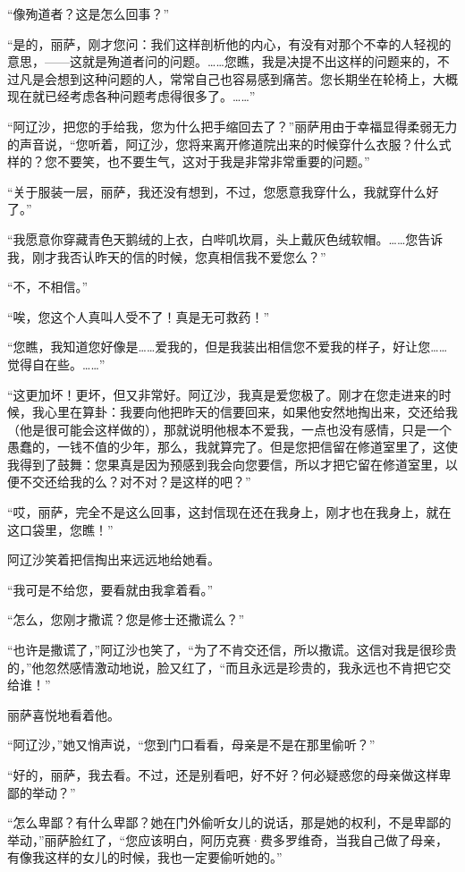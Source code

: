 \par “像殉道者？这是怎么回事？”
\par “是的，丽萨，刚才您问：我们这样剖析他的内心，有没有对那个不幸的人轻视的意思，——这就是殉道者问的问题。……您瞧，我是决提不出这样的问题来的，不过凡是会想到这种问题的人，常常自己也容易感到痛苦。您长期坐在轮椅上，大概现在就已经考虑各种问题考虑得很多了。……”
\par “阿辽沙，把您的手给我，您为什么把手缩回去了？”丽萨用由于幸福显得柔弱无力的声音说，“您听着，阿辽沙，您将来离开修道院出来的时候穿什么衣服？什么式样的？您不要笑，也不要生气，这对于我是非常非常重要的问题。”
\par “关于服装一层，丽萨，我还没有想到，不过，您愿意我穿什么，我就穿什么好了。”
\par “我愿意你穿藏青色天鹅绒的上衣，白哔叽坎肩，头上戴灰色绒软帽。……您告诉我，刚才我否认昨天的信的时候，您真相信我不爱您么？”
\par “不，不相信。”
\par “唉，您这个人真叫人受不了！真是无可救药！”
\par “您瞧，我知道您好像是……爱我的，但是我装出相信您不爱我的样子，好让您……觉得自在些。……”
\par “这更加坏！更坏，但又非常好。阿辽沙，我真是爱您极了。刚才在您走进来的时候，我心里在算卦：我要向他把昨天的信要回来，如果他安然地掏出来，交还给我（他是很可能会这样做的），那就说明他根本不爱我，一点也没有感情，只是一个愚蠢的，一钱不值的少年，那么，我就算完了。但是您把信留在修道室里了，这使我得到了鼓舞：您果真是因为预感到我会向您要信，所以才把它留在修道室里，以便不交还给我的么？对不对？是这样的吧？”
\par “哎，丽萨，完全不是这么回事，这封信现在还在我身上，刚才也在我身上，就在这口袋里，您瞧！”
\par 阿辽沙笑着把信掏出来远远地给她看。
\par “我可是不给您，要看就由我拿着看。”
\par “怎么，您刚才撒谎？您是修士还撒谎么？”
\par “也许是撒谎了，”阿辽沙也笑了，“为了不肯交还信，所以撒谎。这信对我是很珍贵的，”他忽然感情激动地说，脸又红了，“而且永远是珍贵的，我永远也不肯把它交给谁！”
\par 丽萨喜悦地看着他。
\par “阿辽沙，”她又悄声说，“您到门口看看，母亲是不是在那里偷听？”
\par “好的，丽萨，我去看。不过，还是别看吧，好不好？何必疑惑您的母亲做这样卑鄙的举动？”
\par “怎么卑鄙？有什么卑鄙？她在门外偷听女儿的说话，那是她的权利，不是卑鄙的举动，”丽萨脸红了，“您应该明白，阿历克赛·费多罗维奇，当我自己做了母亲，有像我这样的女儿的时候，我也一定要偷听她的。”
